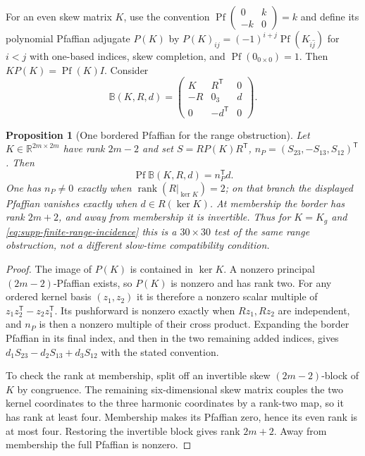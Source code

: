\documentclass[11pt]{article}
\numberwithin{equation}{section}
\newtheorem{proposition}[proposition]{Proposition}
\theoremstyle{definition}
\theoremstyle{remark}
\newcommand{\rank}{\operatorname{rank}}
\begin{document}
For an even skew matrix $K$, use the convention
$\operatorname{Pf}\left(\begin{smallmatrix}0&k\\-k&0\end{smallmatrix}\right)=k$
and define its polynomial Pfaffian adjugate $P(K)$ by
$P(K)_{ij}=(-1)^{i+j}\operatorname{Pf}(K_{\widehat i\widehat j})$ for $i<j$
with one-based indices, skew completion, and
$\operatorname{Pf}(0_{0\times0})=1$.  Then
$KP(K)=\operatorname{Pf}(K)I$.  Consider
\begin{equation}
 \mathbb B(K,R,d)=
 \begin{pmatrix}K&R^{\mathsf T}&0\\-R&0_3&d\\0&-d^{\mathsf T}&0\end{pmatrix}.
 \label{eq:supp-finite-range-border}
\end{equation}

\begin{proposition}[One bordered Pfaffian for the range obstruction]
\label{prop:supp-finite-range-pfaffian}
Let $K\in\mathbb R^{2m\times2m}$ have rank $2m-2$ and set
$S=RP(K)R^{\mathsf T}$, $n_P=(S_{23},-S_{13},S_{12})^{\mathsf T}$.
Then
\begin{equation}
 \operatorname{Pf}\mathbb B(K,R,d)=n_P^{\mathsf T}d.
 \label{eq:supp-finite-range-pfaffian}
\end{equation}
One has $n_P\ne0$ exactly when $\rank(R|_{\ker K})=2$; on that branch
the displayed Pfaffian vanishes exactly when $d\in R(\ker K)$.
At membership the border has rank $2m+2$, and away from membership it is
invertible.  Thus for $K=K_g$ and \eqref{eq:supp-finite-range-incidence}
this is a $30\times30$ test of the same range obstruction, not a different
slow-time compatibility condition.
\end{proposition}
\begin{proof}
The image of $P(K)$ is contained in $\ker K$.  A nonzero principal
$(2m-2)$-Pfaffian exists, so $P(K)$ is nonzero and has rank two.  For any
ordered kernel basis $(z_1,z_2)$ it is therefore a nonzero scalar multiple
of $z_1z_2^{\mathsf T}-z_2z_1^{\mathsf T}$.  Its pushforward is nonzero
exactly when $Rz_1,Rz_2$ are independent, and $n_P$ is then a nonzero
multiple of their cross product.  Expanding the border Pfaffian in its final
index, and then in the two remaining added indices, gives
$d_1S_{23}-d_2S_{13}+d_3S_{12}$ with the stated convention.

To check the rank at membership, split off an invertible skew
$(2m-2)$-block of $K$ by congruence.  The remaining six-dimensional skew
matrix couples the two kernel coordinates to the three harmonic coordinates
by a rank-two map, so it has rank at least four.  Membership makes its
Pfaffian zero, hence its even rank is at most four.  Restoring the invertible
block gives rank $2m+2$.  Away from membership the full Pfaffian is nonzero.
\end{proof}
\end{document}
